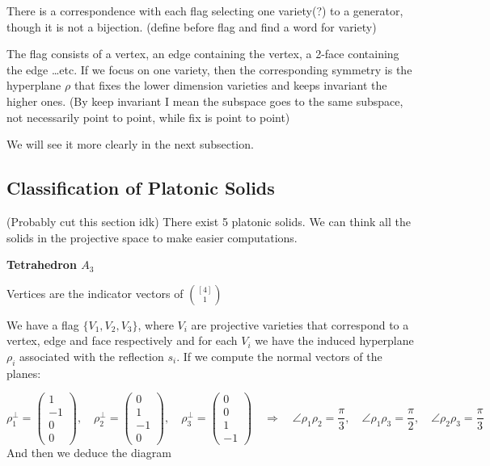 \documentclass{myclass}
\begin{document}
There is a correspondence with each flag selecting one variety(?) to a generator, though it is not a bijection. (define before flag and find a word for variety)

The flag consists of a vertex, an edge containing the vertex, a 2-face containing the edge \ldots etc. If we focus on one variety, then the corresponding symmetry is the hyperplane $\rho $ that fixes the lower dimension varieties and keeps invariant the higher ones. (By keep invariant I mean the subspace goes to the same subspace, not necessarily point to point, while fix is point to point)

We will see it more clearly in the next subsection.

\subsection{Classification of Platonic Solids} (Probably cut this section idk)
There exist 5 platonic solids. We can think all the solids in the projective space to make easier computations.

\textbf{Tetrahedron $A_3$}

Vertices are the indicator vectors of $\binom{[4]}{1}$

We have a flag $\{V_1, V_2, V_3\}$, where $V_i$ are projective varieties that correspond to a vertex, edge and face respectively and for each  $V_i$ we have the induced hyperplane $\rho_i $ associated with the reflection $s_i$. If we compute the normal vectors of the planes:

 \[
\rho_1^\perp = \begin{pmatrix} 1\\-1\\0\\0 \end{pmatrix} , \quad
\rho_2^\perp = \begin{pmatrix} 0\\1\\-1\\0 \end{pmatrix} , \quad
\rho_3^\perp = \begin{pmatrix} 0\\0\\1\\-1 \end{pmatrix} \quad
\Rightarrow \quad
\angle \rho_1 \rho _2 = \frac{\pi}{3}, \quad
\angle \rho_1 \rho _3 = \frac{\pi}{2}, \quad
\angle \rho_2 \rho _3 = \frac{\pi}{3}
\] 
And then we deduce the diagram
\end{document}
